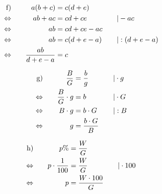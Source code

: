 \begin{exercise}
    \begin{minipage}[t]{0.51\linewidth}
      \makeatletter\@fleqntrue\makeatother
      \begin{alignat*}{3}
        \text{f)}&\quad
        &
        a(b+c)&=c(d+e)
        &
        \quad&\relax
        \\
        \Leftrightarrow&\quad
        &
        ab+ac&=cd+ce
        &
        \quad&|-ac
        \\
        \Leftrightarrow&\quad
        &
        ab&=cd+ce-ac
        &
        \quad&\relax
        \\
        \Leftrightarrow&\quad
        &
        ab&=c(d+e-a)
        &
        \quad&|:(d+e-a)
        \\
        \Leftrightarrow&\quad
        &
        \frac{ab}{d+e-a}&=c
        &
        \quad&\relax
      \end{alignat*}
    \end{minipage}\par
    \begin{minipage}[t]{0.47\linewidth}
      \makeatletter\@fleqntrue\makeatother
      \begin{alignat*}{3}
        \text{g)}&\quad
        &
        \frac{B}{G}&=\frac{b}{g}
        &
        \quad&|\cdot g
        \\
        \Leftrightarrow&\quad
        &
        \frac{B}{G}\cdot g&=b
        &
        \quad&|\cdot G
        \\
        \Leftrightarrow&\quad
        &
        B\cdot g&=b\cdot G
        &
        \quad&|:B
        \\
        \Leftrightarrow&\quad
        &
        g&=\frac{b\cdot G}{B}
        &
        \quad&\relax
      \end{alignat*}
    \end{minipage}\hfill
    \begin{minipage}[t]{0.51\linewidth}
      \makeatletter\@fleqntrue\makeatother
      \begin{alignat*}{3}
        \text{h)}&\quad
        &
        p\%&=\frac{W}{G}
        &
        \quad&\relax
        \\
        \Leftrightarrow&\quad
        &
        p\cdot\frac{1}{100}&=\frac{W}{G}
        &
        \quad&|\cdot100
        \\
        \Leftrightarrow&\quad
        &
        p&=\frac{W\cdot100}{G}

\end{alignat*}
\end{minipage}
\end{exercise}
